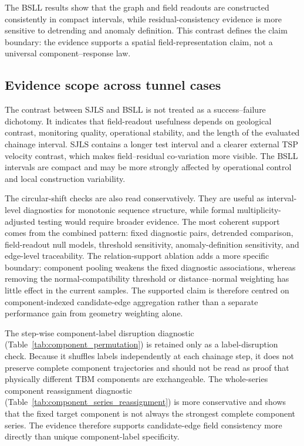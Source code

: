 The BSLL results show that the graph and field readouts are constructed
consistently in compact intervals, while residual-consistency evidence is more
sensitive to detrending and anomaly definition. This contrast defines the
claim boundary: the evidence supports a spatial field-representation
claim, not a universal component--response law.

\subsection{Evidence scope across tunnel cases}
\label{sec:evidential_strength}
The contrast between SJLS and BSLL is not treated as a success--failure
dichotomy. It indicates that field-readout usefulness depends on geological contrast,
monitoring quality, operational stability, and the length of the evaluated
chainage interval. SJLS contains a longer test interval and a clearer external
TSP velocity contrast, which makes field--residual co-variation more
visible. The BSLL intervals are compact and may be more strongly affected by
operational control and local construction variability.

The circular-shift checks are also read conservatively. They are useful
as interval-level diagnostics for monotonic sequence structure, while formal
multiplicity-adjusted testing would require broader evidence. The most coherent
support comes from the
combined pattern: fixed diagnostic pairs, detrended comparison, field-readout
null models, threshold sensitivity, anomaly-definition sensitivity, and
edge-level traceability. The relation-support ablation adds a more specific
boundary: component pooling weakens the fixed diagnostic associations, whereas
removing the normal-compatibility threshold or distance--normal weighting has
little effect in the current samples. The supported claim is therefore centred
on component-indexed candidate-edge aggregation rather than a separate
performance gain from geometry weighting alone.

The step-wise component-label disruption diagnostic
(Table~\ref{tab:component_permutation}) is retained only as a label-disruption
check. Because it shuffles labels independently at each chainage step, it does
not preserve complete component trajectories and should not be read as proof
that physically different TBM components are exchangeable. The whole-series
component reassignment diagnostic (Table~\ref{tab:component_series_reassignment})
is more conservative and shows that the fixed target component is not always
the strongest complete component series. The evidence therefore supports
candidate-edge field consistency more directly than unique
component-label specificity.

